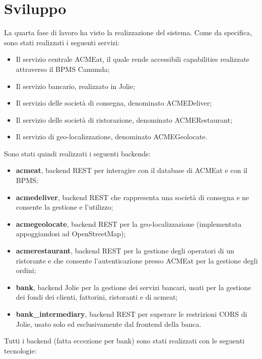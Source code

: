 \documentclass[11pt]{article} %
\begin{document}
\clearpage

\section{Sviluppo}
\label{sez:sviluppo}

La quarta fase di lavoro ha visto la realizzazione del sistema. Come da specifica, sono stati realizzati i seguenti servizi:
\begin{itemize}
\item Il servizio centrale ACMEat, il quale rende accessibili capabilities realizzate attraverso il BPMS Camunda;
\item Il servizio bancario, realizzato in Jolie;
\item Il servizio delle società di consegna, denominato ACMEDeliver;
\item Il servizio delle società di ristorazione, denominato ACMERestaurant;
\item Il servizio di geo-localizzazione, denominato ACMEGeolocate.
\end{itemize}
Sono stati quindi realizzati i seguenti backends:
\begin{itemize}
\item \textbf{acmeat}, backend REST per interagire con il database di ACMEat e con il BPMS;
\item \textbf{acmedeliver}, backend REST che rappresenta una società di consegna e ne consente la gestione e l'utilizzo;
\item \textbf{acmegeolocate}, backend REST per la geo-localizzazione (implementata appoggiandosi ad OpenStreetMap);
\item \textbf{acmerestaurant}, backend REST per la gestione degli operatori di un ristorante e che consente l'autenticazione presso ACMEat per la gestione degli ordini;
\item \textbf{bank}, backend Jolie per la gestione dei servizi bancari, usati per la gestione dei fondi dei clienti, fattorini, ristoranti e di acmeat;
\item \textbf{bank\_intermediary}, backend REST per superare le restrizioni CORS di Jolie, usato solo ed esclusivamente dal frontend della banca.
\end{itemize}
Tutti i backend (fatta eccezione per bank) sono stati realizzati con le seguenti tecnologie:
\end{document}
